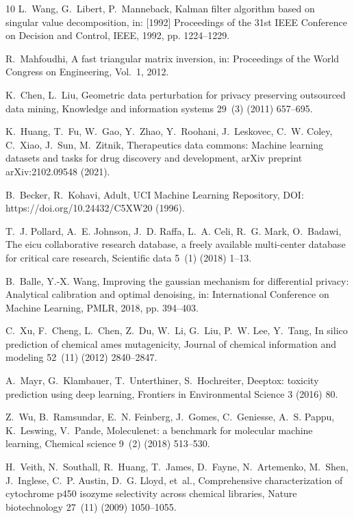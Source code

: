 \documentclass[final,3p,times]{elsarticle}
\theoremstyle{plain}
\begin{document}
\begin{thebibliography}{10}
L.~Wang, G.~Libert, P.~Manneback, Kalman filter algorithm based on singular value decomposition, in: [1992] Proceedings of the 31st IEEE Conference on Decision and Control, IEEE, 1992, pp. 1224--1229.

R.~Mahfoudhi, A fast triangular matrix inversion, in: Proceedings of the World Congress on Engineering, Vol.~1, 2012.

K.~Chen, L.~Liu, Geometric data perturbation for privacy preserving outsourced data mining, Knowledge and information systems 29~(3) (2011) 657--695.

K.~Huang, T.~Fu, W.~Gao, Y.~Zhao, Y.~Roohani, J.~Leskovec, C.~W. Coley, C.~Xiao, J.~Sun, M.~Zitnik, Therapeutics data commons: Machine learning datasets and tasks for drug discovery and development, arXiv preprint arXiv:2102.09548 (2021).

B.~Becker, R.~Kohavi, {Adult}, UCI Machine Learning Repository, {DOI}: https://doi.org/10.24432/C5XW20 (1996).

T.~J. Pollard, A.~E. Johnson, J.~D. Raffa, L.~A. Celi, R.~G. Mark, O.~Badawi, The eicu collaborative research database, a freely available multi-center database for critical care research, Scientific data 5~(1) (2018) 1--13.

B.~Balle, Y.-X. Wang, Improving the gaussian mechanism for differential privacy: Analytical calibration and optimal denoising, in: International Conference on Machine Learning, PMLR, 2018, pp. 394--403.

C.~Xu, F.~Cheng, L.~Chen, Z.~Du, W.~Li, G.~Liu, P.~W. Lee, Y.~Tang, In silico prediction of chemical ames mutagenicity, Journal of chemical information and modeling 52~(11) (2012) 2840--2847.

A.~Mayr, G.~Klambauer, T.~Unterthiner, S.~Hochreiter, Deeptox: toxicity prediction using deep learning, Frontiers in Environmental Science 3 (2016) 80.

Z.~Wu, B.~Ramsundar, E.~N. Feinberg, J.~Gomes, C.~Geniesse, A.~S. Pappu, K.~Leswing, V.~Pande, Moleculenet: a benchmark for molecular machine learning, Chemical science 9~(2) (2018) 513--530.

H.~Veith, N.~Southall, R.~Huang, T.~James, D.~Fayne, N.~Artemenko, M.~Shen, J.~Inglese, C.~P. Austin, D.~G. Lloyd, et~al., Comprehensive characterization of cytochrome p450 isozyme selectivity across chemical libraries, Nature biotechnology 27~(11) (2009) 1050--1055.


\end{thebibliography}
\end{document}

